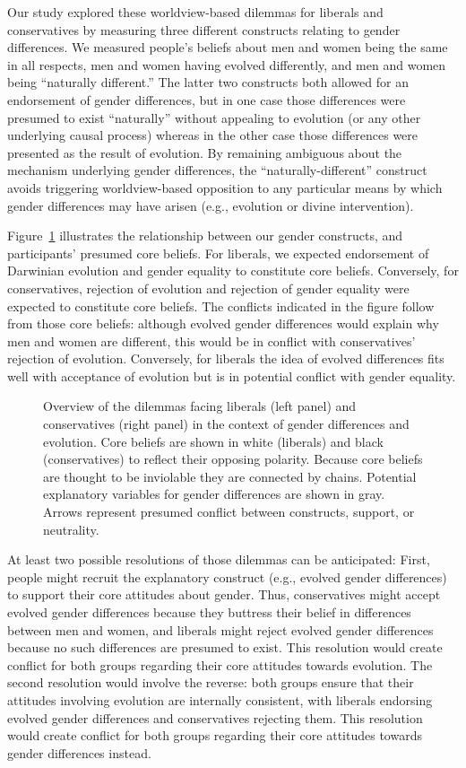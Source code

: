 \documentclass[fignum,man]{apa}\usepackage[]{graphicx}\usepackage[]{color}
\begin{document}
Our study explored these worldview-based dilemmas for
liberals and conservatives by measuring 
three different constructs relating to gender differences.
We measured
people's beliefs about men and women being the same in all
respects, men and women having evolved differently,
and men and women being ``naturally different.'' 
The latter two constructs both allowed for an endorsement
of gender differences, but in one case those differences
were presumed to exist ``naturally'' without appealing
to evolution (or any other underlying causal process) 
whereas in the other case those differences 
were presented as the result of evolution. 
By remaining ambiguous about the mechanism underlying
gender differences, the ``naturally-different'' construct 
avoids triggering worldview-based opposition to any
particular means by which gender differences may have arisen 
(e.g., evolution or divine intervention).

Figure~\ref{fig:dilemmas} illustrates the relationship
between our gender constructs, and participants' presumed
core beliefs. For liberals, we expected endorsement of
Darwinian evolution and gender equality to constitute core beliefs. Conversely,
for conservatives, rejection of evolution and rejection of 
gender equality were expected to constitute core beliefs.
The conflicts indicated in the figure follow from those core
beliefs: although evolved gender differences would explain
why men and women are different, this would be in conflict with
conservatives' rejection of evolution. Conversely,
for liberals the idea of evolved differences fits
well with acceptance of evolution but is in potential conflict with 
gender equality.
\begin{figure}[tp] %
	\caption{Overview of the dilemmas facing liberals (left panel) and conservatives
	(right panel) in the context of gender differences and evolution. Core beliefs
    are shown in white (liberals) and black (conservatives) to reflect their
	opposing polarity. Because core beliefs are thought to be inviolable
	they are connected by chains. Potential explanatory variables for gender
	differences are shown in gray. Arrows represent presumed conflict between constructs,
	support, or neutrality. }
	\label{fig:dilemmas}
\end{figure}

At least two possible resolutions of those dilemmas can be anticipated:
First, people might recruit the explanatory construct (e.g., evolved
gender differences) to support their core attitudes about gender. Thus,
conservatives might accept evolved gender differences because they buttress
their belief in differences between men and women, and liberals might
reject evolved gender differences because no such differences are presumed to exist.
This resolution would create conflict for both groups regarding their core attitudes
towards evolution. The second resolution would involve the reverse: both groups 
ensure that their attitudes involving evolution are internally consistent, 
with liberals endorsing
evolved gender differences and conservatives rejecting them. This resolution 
would create conflict for both groups regarding their core attitudes towards 
gender differences instead.
\end{document}
